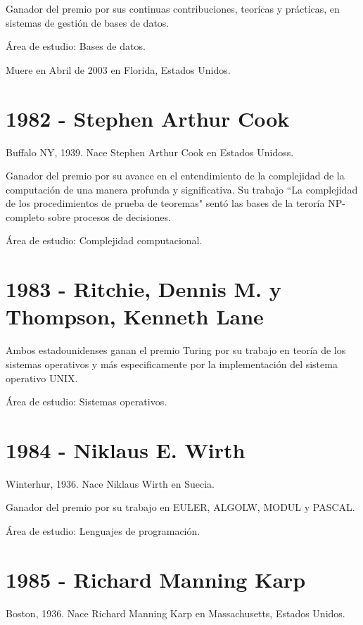 \documentclass[a4paper, 11pt]{article}
\begin{document}
\noindent Ganador del premio por sus continuas contribuciones, teorícas y prácticas, en sistemas de gestión de bases de datos. 

\noindent Área de estudio: Bases de datos.

\noindent Muere en Abril de 2003 en Florida, Estados Unidos.
\newline

\section*{1982 - Stephen Arthur Cook}
\noindent Buffalo NY, 1939. Nace Stephen Arthur Cook en Estados Unidoss.

\noindent Ganador del premio por su avance en el entendimiento de la complejidad de la computación de una manera profunda y significativa. Su trabajo ``La complejidad de los procedimientos de prueba de teoremas" sentó las bases de la teroría NP-completo sobre procesos de decisiones.

\noindent Área de estudio: Complejidad computacional.
\newline

\section*{1983 - Ritchie, Dennis M. y Thompson, Kenneth Lane}
\noindent Ambos estadounidenses ganan el premio Turing por su trabajo en teoría de los sistemas operativos y más especificamente por la implementación del sistema operativo UNIX.

\noindent Área de estudio: Sistemas operativos.
\newline

\section*{1984 - Niklaus E. Wirth}
\noindent Winterhur, 1936. Nace Niklaus Wirth en Suecia.

\noindent Ganador del premio por su trabajo en EULER, ALGOLW, MODUL y PASCAL.

\noindent Área de estudio: Lenguajes de programación.
\newline

\section*{1985 - Richard Manning Karp}
\noindent Boston, 1936. Nace Richard Manning Karp en Massachusetts, Estados Unidos.
\end{document}
